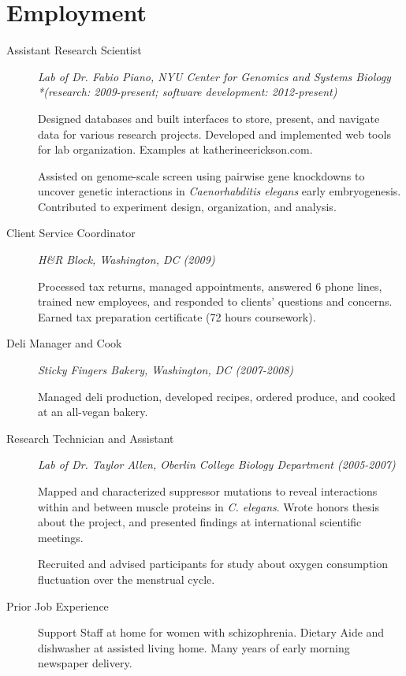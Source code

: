 \documentclass{article}
\begin{document}
	\section*{Employment}
	\begin{description}
		\item[Assistant Research Scientist]
		\emph{Lab of Dr. Fabio Piano,
			NYU Center for Genomics and Systems Biology
			\\*(research: 2009-present; software development: 2012-present)
		}

		Designed databases and built interfaces to store, present, 
		and navigate data for various research projects.
		Developed and implemented web tools for lab organization.
		Examples at katherineerickson.com.
		
		Assisted on genome-scale screen using pairwise gene knockdowns to uncover
		genetic interactions in \emph{Caenorhabditis elegans} early embryogenesis. 
		Contributed to experiment design, organization, and analysis.

		\item[Client Service Coordinator]
		\emph{H\&R Block, Washington, DC (2009)}
			
		Processed tax returns, managed appointments, answered 6 phone lines, 
		trained new employees, and responded to clients' questions and concerns.
		Earned tax preparation certificate (72 hours coursework).

		\item[Deli Manager and Cook]
		\emph{Sticky Fingers Bakery, Washington, DC (2007-2008)}
		
		Managed deli production, developed recipes, ordered produce,
		and cooked at an all-vegan bakery.

		\item[Research Technician and Assistant]
		\emph{Lab of Dr. Taylor Allen,
			Oberlin College Biology Department (2005-2007)
		}
		
		Mapped and characterized suppressor mutations to reveal interactions 
		within and between muscle proteins in \emph{C. elegans}.
		Wrote honors thesis about the project, 
		and presented findings at international scientific meetings.

		Recruited and advised participants for study about oxygen
		consumption fluctuation over the menstrual cycle.

		\item[Prior Job Experience]
		Support Staff at home for women with schizophrenia.
		Dietary Aide and dishwasher at assisted living home.
		Many years of early morning newspaper delivery.
	\end{description}
\end{document}
